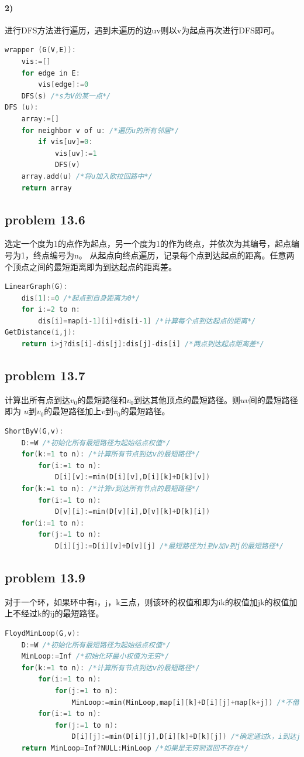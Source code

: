 \documentclass[11pt,a4paper,oneside,oldfontcommands]{ctexart}
\begin{document}
\paragraph*{2)}
进行DFS方法进行遍历，遇到未遍历的边uv则以v为起点再次进行DFS即可。
\begin{lstlisting}[language=C++,title=Euler.func]
wrapper (G(V,E)):
	vis:=[]
	for edge in E:
		vis[edge]:=0
	DFS(s) /*s为V的某一点*/
DFS (u):
	array:=[]
	for neighbor v of u: /*遍历u的所有邻居*/
		if vis[uv]=0:
			vis[uv]:=1
			DFS(v)
	array.add(u) /*将u加入欧拉回路中*/
	return array
\end{lstlisting}
\newpage
{\subsection*{problem 13.6}}
选定一个度为1的点作为起点，另一个度为1的作为终点，并依次为其编号，起点编号为1，终点编号为n。
从起点向终点遍历，记录每个点到达起点的距离。任意两个顶点之间的最短距离即为到达起点的距离差。
\begin{lstlisting}[language=C++,title=LinearGraph.func]
LinearGraph(G):
	dis[1]:=0 /*起点到自身距离为0*/
	for i:=2 to n:
		dis[i]=map[i-1][i]+dis[i-1] /*计算每个点到达起点的距离*/
GetDistance(i,j):
	return i>j?dis[i]-dis[j]:dis[j]-dis[i] /*两点到达起点距离差*/
\end{lstlisting}
{\subsection*{problem 13.7}}
计算出所有点到达$v_0$的最短路径和$v_0$到达其他顶点的最短路径。则$uv$间的最短路径即为
$u$到$v_0$的最短路径加上$v$到$v_0$的最短路径。
\begin{lstlisting}[language=C++,title=ShortByV.func]
ShortByV(G,v):
	D:=W /*初始化所有最短路径为起始结点权值*/
	for(k:=1 to n): /*计算所有节点到达v的最短路径*/
		for(i:=1 to n):
			D[i][v]:=min(D[i][v],D[i][k]+D[k][v])
	for(k:=1 to n): /*计算v到达所有节点的最短路径*/
		for(i:=1 to n):
			D[v][i]:=min(D[v][i],D[v][k]+D[k][i])
	for(i:=1 to n):
		for(j:=1 to n):
			D[i][j]:=D[i][v]+D[v][j] /*最短路径为i到v加v到j的最短路径*/
\end{lstlisting}
\newpage
{\subsection*{problem 13.9}}
对于一个环，如果环中有i，j，k三点，则该环的权值和即为ik的权值加jk的权值加上不经过k的ij的最短路径。
\begin{lstlisting}[language=C++,title=FloydMinLoop.func]
FloydMinLoop(G,v):
	D:=W /*初始化所有最短路径为起始结点权值*/
	MinLoop:=Inf /*初始化环最小权值为无穷*/
	for(k:=1 to n): /*计算所有节点到达v的最短路径*/
		for(i:=1 to n):
			for(j:=1 to n):
				MinLoop:=min(MinLoop,map[i][k]+D[i][j]+map[k+j]) /*不借助k，i到达j的最短路径*/
		for(i:=1 to n):
			for(j:=1 to n):
				D[i][j]:=min(D[i][j],D[i][k]+D[k][j]) /*确定通过k，i到达j的最短路径*/
	return MinLoop=Inf?NULL:MinLoop /*如果是无穷则返回不存在*/
\end{lstlisting}
\end{document}
